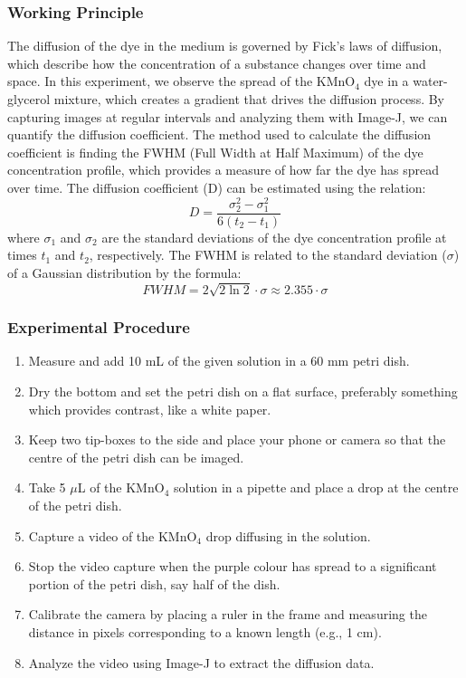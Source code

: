 \documentclass[openany]{book}
\begin{document}
\subsubsection{Working Principle}
The diffusion of the dye in the medium is governed by Fick's laws of diffusion, which describe how the concentration of a substance changes over time and space. In this experiment, we observe the spread of the KMnO$_4$ dye in a water-glycerol mixture, which creates a gradient that drives the diffusion process. By capturing images at regular intervals and analyzing them with Image-J, we can quantify the diffusion coefficient. The method used to calculate the diffusion coefficient is finding the FWHM (Full Width at Half Maximum) of the dye concentration profile, which provides a measure of how far the dye has spread over time. The diffusion coefficient (D) can be estimated using the relation: 
$$\boxed{D = \frac{\sigma_2^2 - \sigma_1^2}{6(t_2 - t_1)}}$$
where $\sigma_1$ and $\sigma_2$ are the standard deviations of the dye concentration profile at times $t_1$ and $t_2$, respectively.
The FWHM is related to the standard deviation ($\sigma$) of a Gaussian distribution by the formula:
$$\boxed{FWHM = 2\sqrt{2\ln{2}} \cdot \sigma \approx 2.355 \cdot \sigma}$$
\subsubsection{Experimental Procedure}
\begin{enumerate}
    \item Measure and add 10 mL of the given solution in a 60 mm petri dish. 
    \item Dry the bottom and set the petri dish on a flat surface, preferably something which provides contrast, like a white paper. 
    \item Keep two tip-boxes to the side and place your phone or camera so that the centre of the petri dish can be imaged.
    \item Take 5 $\mu$L of the KMnO$_4$ solution in a pipette and place a drop at the centre of the petri dish. 
    \item Capture a video of the KMnO$_4$ drop diffusing in the solution.
    \item Stop the video capture when the purple colour has spread to a significant portion of the petri dish, say half of the dish.
    \item Calibrate the camera by placing a ruler in the frame and measuring the distance in pixels corresponding to a known length (e.g., 1 cm).
    \item Analyze the video using Image-J to extract the diffusion data.
\end{enumerate}
\end{document}
